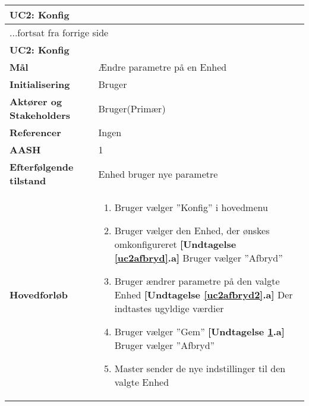 \begin{center} \centering \label{UC2}
	\begin{longtable}{|p{5cm}|p{9cm}|}  %
	\hline
		\multicolumn{2}{|l|}{\textbf{UC2: Konfig}} \\\hline %
		\endfirsthead
		
		\multicolumn{2}{l}{...fortsat fra forrige side} \\ \hline %
		\multicolumn{2}{|l|}{\textbf{UC2: Konfig}} \\\hline %
		\endhead	
		
		\textbf{Mål}								&Ændre parametre på en Enhed		\\\hline
		\textbf{Initialisering}					&Bruger							\\\hline
		\textbf{Aktører og Stakeholders}			&Bruger(Primær)					\\\hline
		\textbf{Referencer}						&Ingen							\\\hline
		\textbf{AASH}							&1								\\\hline
		\textbf{Efterfølgende tilstand}			&Enhed bruger nye parametre		\\\hline
		\textbf{Hovedforløb}					
			&\begin{enumerate}
	
				\item Bruger vælger ''Konfig'' i hovedmenu
				
				\item \label{uc2afbryd}Bruger vælger den Enhed, der ønskes omkonfigureret\newline
				\textbf{[Undtagelse \ref{uc2afbryd}.a]} \newline
					Bruger vælger ''Afbryd''
				
				\item \label{uc2afbryd2}Bruger ændrer parametre på den valgte Enhed
				\textbf{[Undtagelse \ref{uc2afbryd2}.a]} \newline
					Der indtastes ugyldige værdier	
									
				\item \label{uc2afbryd3} Bruger vælger ''Gem''\newline
				\textbf{[Undtagelse \ref{uc2afbryd3}.a]} \newline
					Bruger vælger ''Afbryd''
				
				\item Master sender de nye indstillinger til den valgte Enhed
			

\end{enumerate}
\end{longtable}
\end{center}
